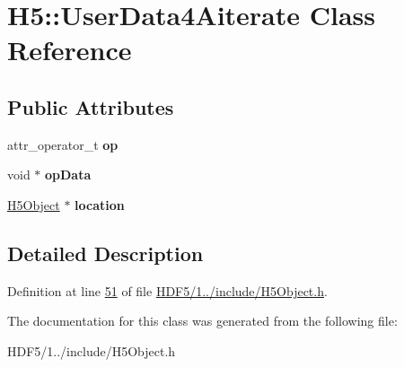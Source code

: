 \hypertarget{class_h5_1_1_user_data4_aiterate}{}\section{H5\+:\+:User\+Data4\+Aiterate Class Reference}
\label{class_h5_1_1_user_data4_aiterate}
\subsection*{Public Attributes}
\begin{DoxyCompactItemize}
\item 
\mbox{\label{class_h5_1_1_user_data4_aiterate_adc317bc595aa58e76e24a11f43367d13}} 
attr\+\_\+operator\+\_\+t {\bfseries op}
\item 
\mbox{\label{class_h5_1_1_user_data4_aiterate_ac6f8c6f24a352fa43553d431c46ffe85}} 
void $\ast$ {\bfseries op\+Data}
\item 
\mbox{\label{class_h5_1_1_user_data4_aiterate_a62a00aff93c2f1231f6ba41675977aaa}} 
\hyperlink{class_h5_1_1_h5_object}{H5\+Object} $\ast$ {\bfseries location}
\end{DoxyCompactItemize}


\subsection{Detailed Description}


Definition at line \hyperlink{_h_d_f5_21_810_81_2include_2_h5_object_8h_source_l00051}{51} of file \hyperlink{_h_d_f5_21_810_81_2include_2_h5_object_8h_source}{H\+D\+F5/1../include/\+H5\+Object.\+h}.



The documentation for this class was generated from the following file\+:\begin{DoxyCompactItemize}
\item 
H\+D\+F5/1../include/\+H5\+Object.\+h\end{DoxyCompactItemize}
